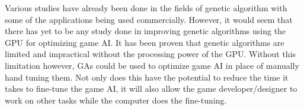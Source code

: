 

Various studies have already been done in the fields of genetic algorithm with
some of the applications being used commercially. However, it would seem that there
has yet to be any study done in improving genetic algorithms using the GPU for optimizing
game AI. It has been proven that genetic algorithms are limited and impractical without
the processing power of the GPU\cite{Banzhaf09}. Without this limitation however, GAs
could be used to optimize game AI in place of manually hand tuning them. Not only does
this have the potential to reduce the time it takes to fine-tune the game AI, it will
also allow the game developer/designer to work on other tasks while the computer
does the fine-tuning.